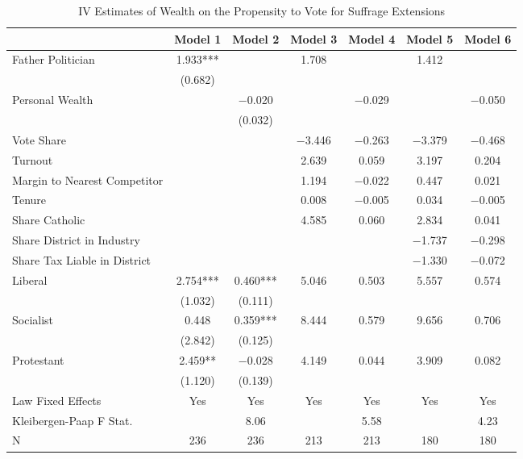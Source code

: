 \begin{table}

\caption{\label{tab:ivresults_suffrage_otherclassific}IV Estimates of Wealth on the Propensity to Vote for Suffrage Extensions}
\centering
\begin{tabular}[t]{lcccccc}
\toprule
  & Model 1 & Model 2 & Model 3 & Model 4 & Model 5 & Model 6\\
\midrule
Father Politician & \num{1.933}*** &  & \num{1.708} &  & \num{1.412} & \\
 & (\num{0.682}) &  &  &  &  & \\
Personal Wealth &  & \num{-0.020} &  & \num{-0.029} &  & \num{-0.050}\\
 &  & (\num{0.032}) &  &  &  & \\
Vote Share &  &  & \num{-3.446} & \num{-0.263} & \num{-3.379} & \num{-0.468}\\
Turnout &  &  & \num{2.639} & \num{0.059} & \num{3.197} & \num{0.204}\\
Margin to Nearest Competitor &  &  & \num{1.194} & \num{-0.022} & \num{0.447} & \num{0.021}\\
Tenure &  &  & \num{0.008} & \num{-0.005} & \num{0.034} & \num{-0.005}\\
Share Catholic &  &  & \num{4.585} & \num{0.060} & \num{2.834} & \num{0.041}\\
Share District in Industry &  &  &  &  & \num{-1.737} & \num{-0.298}\\
Share Tax Liable in District &  &  &  &  & \num{-1.330} & \num{-0.072}\\
Liberal & \num{2.754}*** & \num{0.460}*** & \num{5.046} & \num{0.503} & \num{5.557} & \num{0.574}\\
 & (\num{1.032}) & (\num{0.111}) &  &  &  & \\
Socialist & \num{0.448} & \num{0.359}*** & \num{8.444} & \num{0.579} & \num{9.656} & \num{0.706}\\
 & (\num{2.842}) & (\num{0.125}) &  &  &  & \\
Protestant & \num{2.459}** & \num{-0.028} & \num{4.149} & \num{0.044} & \num{3.909} & \num{0.082}\\
 & (\num{1.120}) & (\num{0.139}) &  &  &  & \\
\midrule
Law Fixed Effects & Yes & Yes & Yes & Yes & Yes & Yes\\
Kleibergen-Paap F Stat. &  & 8.06 &  & 5.58 &  & 4.23\\
N & \num{236} & \num{236} & \num{213} & \num{213} & \num{180} & \num{180}\\

\end{tabular}
\end{table}
